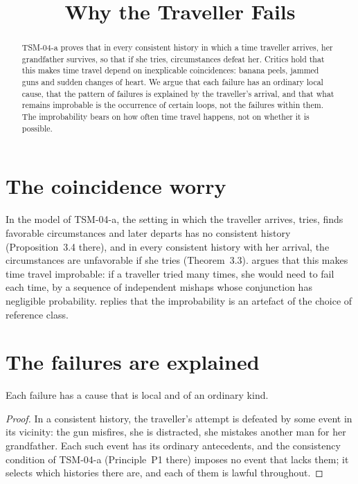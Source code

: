 \documentclass{situationist-preprint}
\title{Why the Traveller Fails}
\begin{document}
\maketitle

\begin{abstract}
TSM-04-a proves that in every consistent history in which a time traveller arrives, her grandfather survives, so that if she tries, circumstances defeat her. Critics hold that this makes time travel depend on inexplicable coincidences: banana peels, jammed guns and sudden changes of heart. We argue that each failure has an ordinary local cause, that the pattern of failures is explained by the traveller's arrival, and that what remains improbable is the occurrence of certain loops, not the failures within them. The improbability bears on how often time travel happens, not on whether it is possible.
\end{abstract}

\section{The coincidence worry}

In the model of TSM-04-a, the setting in which the traveller arrives, tries, finds favorable circumstances and later departs has no consistent history (Proposition~3.4 there), and in every consistent history with her arrival, the circumstances are unfavorable if she tries (Theorem~3.3). \citet{Horwich1987} argues that this makes time travel improbable: if a traveller tried many times, she would need to fail each time, by a sequence of independent mishaps whose conjunction has negligible probability. \citet{Smith1997} replies that the improbability is an artefact of the choice of reference class.

\section{The failures are explained}

\begin{proposition}\label{p:local}
Each failure has a cause that is local and of an ordinary kind.
\end{proposition}

\begin{proof}
In a consistent history, the traveller's attempt is defeated by some event in its vicinity: the gun misfires, she is distracted, she mistakes another man for her grandfather. Each such event has its ordinary antecedents, and the consistency condition of TSM-04-a (Principle~P1 there) imposes no event that lacks them; it selects which histories there are, and each of them is lawful throughout.
\end{proof}
\end{document}
